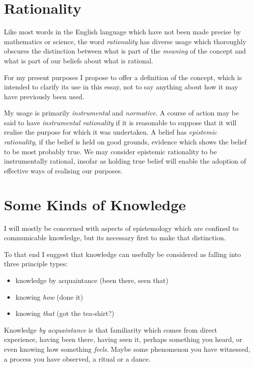 \documentclass[10pt,titlepage]{book}
\begin{document}
\section{Rationality}

Like most words in the English language which have not been made precise by mathematics or science, the word \emph{rationality} has diverse usage which thoroughly obscures the distinction between what is part of the \emph{meaning} of the concept and what is part of our beliefs about what is rational.

For my present purposes I propose to offer a definition of the concept, which is intended to clarify its use in this essay, not to say anything about how it may have previously been used.

My usage is primarily \emph{instrumental} and \emph{normative}.
A course of action may be said to have \emph{instrumental rationality}  if it is reasonable to suppose that it will realise the purpose for which it was undertaken.
A belief has \emph{epistemic rationality}, if the belief is held on good grounds, evidence which shows the belief to be most probably true.
We may consider epistemic rationality to be instrumentally rational, insofar as holding true belief will enable the adoption of effective ways of realising our purposes.

\section{Some Kinds of Knowledge}

I will mostly be concerned with aspects of epistemology which are confined to communicable knowledge, but its necessary first to make that distinction.

To that end I suggest that knowledge can usefully be considered as falling into three principle types:

\begin{itemize}
\item knowledge by acquaintance (been there, seen that)
\item knowing \emph{how} (done it)
\item knowing \emph{that} (got the tea-shirt?)
\end{itemize}

Knowledge \emph{by acquaintance} is that familiarity which comes from direct experience, having been there, having seen it, perhaps something you heard, or even knowing how something \emph{feels}.
Maybe some phenomenon you have witnessed, a process you have observed, a ritual or a dance.
\end{document}
